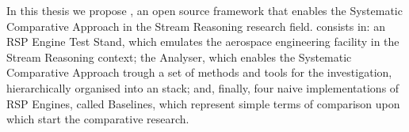 In this thesis we propose \namens, an open source framework that enables the Systematic Comparative Approach in the Stream Reasoning research field. \name consists in:  an RSP Engine Test Stand, which emulates the aerospace engineering facility in the Stream Reasoning context; the Analyser, which enables the Systematic Comparative Approach trough a set of methods and tools for the investigation, hierarchically organised into an stack; and, finally, four naive implementations of RSP Engines, called Baselines, which represent simple terms of comparison upon which  start the comparative research.